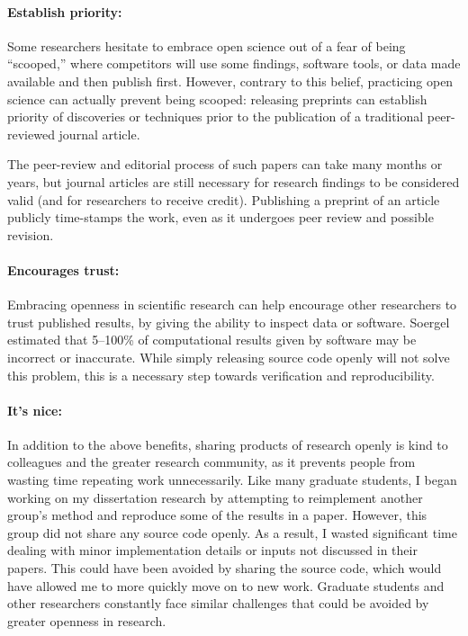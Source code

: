 \documentclass[nobib]{tufte-handout}
\begin{document}
\paragraph{Establish priority:}
Some researchers hesitate to embrace open science out of a fear of being ``scooped,''
where competitors will use some findings, software tools, or data made available
and then publish first. However, contrary to this belief, practicing open science
can actually prevent being scooped: releasing preprints can establish priority of
discoveries or techniques prior to the publication of a traditional peer-reviewed
journal article\autocite{Berg:2016gl,Strasser:2016fr}.

The peer-review and editorial process of such papers can take many months or years,
but journal articles are still necessary for research findings to be considered valid
(and for researchers to receive credit). Publishing a preprint of an article
publicly time-stamps the work, even as it undergoes peer review and possible
revision.

\paragraph{Encourages trust:}
Embracing openness in scientific research can help encourage other researchers
to trust published results, by giving the ability to inspect data or software.
Soergel estimated that 5--100\% of computational results given by software
may be incorrect or inaccurate\autocite{Soergel:2015ef}. While simply releasing
source code openly will not solve this problem, this is a necessary step towards
verification and reproducibility.

\paragraph{It's nice:}
In addition to the above benefits, sharing products of research openly is kind
to colleagues and the greater research community, as it prevents people from
wasting time repeating work unnecessarily.
Like many graduate students, I began working on my dissertation research by
attempting to reimplement another group's method and reproduce some of the
results in a paper. However, this group did not share any source code openly.
As a result, I wasted significant time dealing with minor implementation details
or inputs not discussed in their papers. This could have been avoided by sharing
the source code, which would have allowed me to more quickly move on to new work.
Graduate students and other researchers constantly face similar challenges that
could be avoided by greater openness in research.
\end{document}

